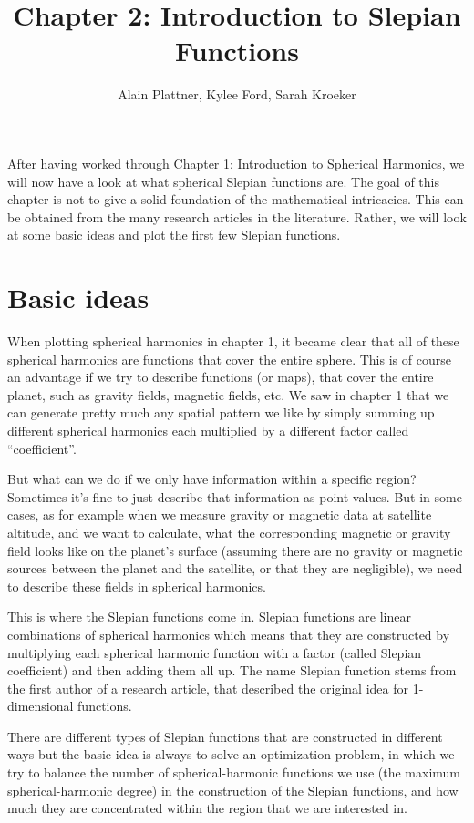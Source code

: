 \documentclass[11pt]{article}
\title{Chapter 2: Introduction to Slepian Functions}
\author{Alain Plattner, Kylee Ford, Sarah Kroeker}
\begin{document}
\maketitle

After having worked through Chapter 1: Introduction to Spherical
Harmonics, we will now have a look at what spherical Slepian functions
are. The goal of this chapter is not to give a solid foundation of the
mathematical intricacies. This can be obtained from the many research
articles in the literature. Rather, we will look at some basic ideas
and plot the first few Slepian functions.


\section{Basic ideas}
When plotting spherical harmonics in chapter 1, it became clear that
all of these spherical harmonics are functions that cover the entire
sphere. This is of course an advantage if we try to describe functions
(or maps), that cover the entire planet, such as gravity fields,
magnetic fields, etc. We saw in chapter 1 that we can generate pretty
much any spatial pattern we like by simply summing up different
spherical harmonics each multiplied by a different factor called
``coefficient''.

But what can we do if we only have information within a specific
region? Sometimes it's fine to just describe that information as
point values. But in some cases, as for example when we measure
gravity or magnetic data at satellite altitude, and we want to
calculate, what the corresponding magnetic or gravity field looks like
on the planet's surface (assuming there are no gravity or magnetic
sources between the planet and the satellite, or that they are
negligible), we need to describe these fields in spherical harmonics.

This is where the Slepian functions come in. Slepian functions are
linear combinations of spherical harmonics which means that they are
constructed by multiplying each spherical harmonic function with a
factor (called Slepian coefficient) and then adding them all up. The name
Slepian function stems from the first author of a research article,
that described the original idea for 1-dimensional functions.

There are different types of Slepian functions that are constructed in
different ways but the basic idea is always to solve an optimization
problem, in which we try to balance the number of spherical-harmonic
functions we use (the maximum spherical-harmonic degree) in the
construction of the Slepian functions, and how much they are
concentrated within the region that we are interested in.
\end{document}
